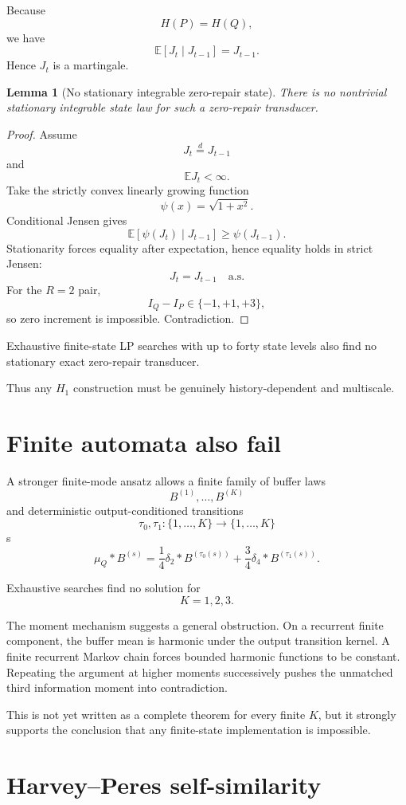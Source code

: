 \documentclass[11pt,a4paper]{article}
\newtheorem{lemma}[theorem]{Lemma}
\newcommand{\E}{\mathbb E}
\begin{document}
Because
\[
H(P)=H(Q),
\]
we have
\[
\E[J_t\mid J_{t-1}]
=
J_{t-1}.
\]
Hence \(J_t\) is a martingale.

\begin{lemma}[No stationary integrable zero-repair state]
There is no nontrivial stationary integrable state law for such a
zero-repair transducer.
\end{lemma}

\begin{proof}
Assume
\[
J_t\stackrel d=J_{t-1}
\]
and
\[
\E J_t<\infty.
\]
Take the strictly convex linearly growing function
\[
\psi(x)=\sqrt{1+x^2}.
\]
Conditional Jensen gives
\[
\E[\psi(J_t)\mid J_{t-1}]
\ge
\psi(J_{t-1}).
\]
Stationarity forces equality after expectation, hence equality holds in
strict Jensen:
\[
J_t=J_{t-1}
\quad\text{a.s.}
\]
For the \(R=2\) pair,
\[
I_Q-I_P\in\{-1,+1,+3\},
\]
so zero increment is impossible.  Contradiction.
\end{proof}

Exhaustive finite-state LP searches with up to forty state levels also
find no stationary exact zero-repair transducer.

Thus any \(H_1\) construction must be genuinely history-dependent and
multiscale.

\section{Finite automata also fail}

A stronger finite-mode ansatz allows a finite family of buffer laws
\[
B^{(1)},\ldots,B^{(K)}
\]
and deterministic output-conditioned transitions
\[
\tau_0,\tau_1:
\{1,\ldots,K\}\to\{1,\ldots,K\}
\]
s
\[
\mu_Q*B^{(s)}
=
\frac14\delta_2*B^{(\tau_0(s))}
+
\frac34\delta_4*B^{(\tau_1(s))}.
\]

Exhaustive searches find no solution for
\[
K=1,2,3.
\]

The moment mechanism suggests a general obstruction.  On a recurrent
finite component, the buffer mean is harmonic under the output transition
kernel.  A finite recurrent Markov chain forces bounded harmonic functions
to be constant.  Repeating the argument at higher moments successively
pushes the unmatched third information moment into contradiction.

This is not yet written as a complete theorem for every finite \(K\), but it
strongly supports the conclusion that any finite-state implementation is
impossible.

\section{Harvey--Peres self-similarity}
\end{document}
